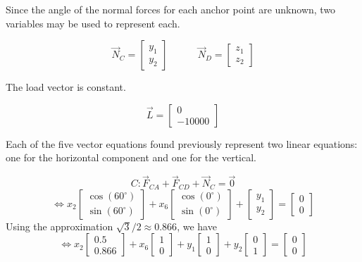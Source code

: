 \begin{applicationActivities}
\begin{observation}
\end{observation}

\begin{observation}
Since the angle of the normal forces for each anchor point are unknown,
two variables may be used to represent each.

\drawtruss{\trussNormalForces}

\[
\vec N_C=\begin{bmatrix}y_1\\y_2\end{bmatrix}
\hspace{3em}
\vec N_D=\begin{bmatrix}z_1\\z_2\end{bmatrix}
\]

The load vector is constant.

\[
\vec L = \begin{bmatrix}0\\-10000\end{bmatrix}
\]

\end{observation}

\begin{remark}
Each of the five vector
equations found previously represent two linear equations:
one for the horizontal component and one for the vertical.

\drawtruss{\trussStrutVariables}

\[
C: \vec F_{CA}+\vec F_{CD}+\vec N_C=\vec 0
\]
\[
\Leftrightarrow
x_2\begin{bmatrix}\cos(60^\circ)\\\sin(60^\circ)\end{bmatrix}+
x_6\begin{bmatrix}\cos(0^\circ)\\\sin(0^\circ)\end{bmatrix}+
\begin{bmatrix}y_1\\y_2\end{bmatrix}=\begin{bmatrix}0\\0\end{bmatrix}
\]
Using the approximation \(\sqrt{3}/2\approx 0.866\), we have
\[
\Leftrightarrow
x_2\begin{bmatrix}0.5\\0.866\end{bmatrix}+
x_6\begin{bmatrix}1\\0\end{bmatrix}+
y_1\begin{bmatrix}1\\0\end{bmatrix}+
y_2\begin{bmatrix}0\\1\end{bmatrix}=
\begin{bmatrix}0\\0\end{bmatrix}
\]
\end{remark}


\end{applicationActivities}
